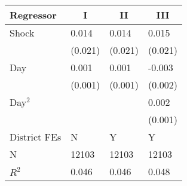 %
\begin{tabular*}{\textwidth}{@{\extracolsep{\fill}}llll}\hline\hline
\multicolumn{1}{l}{Regressor}&\multicolumn{1}{c}{I}&\multicolumn{1}{c}{II}&\multicolumn{1}{c}{III}\tabularnewline
\hline
Shock&0.014$^{}$&0.014$^{}$&0.015$^{}$\tabularnewline
&{\scriptsize (0.021)}&{\scriptsize (0.021)}&{\scriptsize (0.021)}\tabularnewline
Day&0.001$^{}$&0.001$^{}$&-0.003$^{}$\tabularnewline
&{\scriptsize (0.001)}&{\scriptsize (0.001)}&{\scriptsize (0.002)}\tabularnewline
Day$^2$&&&0.002$^{}$\tabularnewline
&&&{\scriptsize (0.001)}\tabularnewline
District FEs&N&Y&Y\tabularnewline
N&12103&12103&12103\tabularnewline
$R^2$&0.046&0.046&0.048\tabularnewline
\hline
\end{tabular*}

